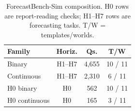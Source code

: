 \begin{table}[t]
\centering
\caption{ForecastBench-Sim composition. H0 rows are report-reading checks; H1--H7 rows are forecasting tasks. T/W = templates/worlds.}
\label{tab:benchmark-composition}
\small
\begin{tabular}{lccc}
\toprule
Family & Horiz. & Qs. & T/W \\
\midrule
Binary & H1--H7 & 4,655 & 10 / 11 \\
Continuous & H1--H7 & 2,310 & 6 / 11 \\
H0 binary & H0 & 562 & 10 / 11 \\
H0 continuous & H0 & 165 & 3 / 11 \\
\bottomrule
\end{tabular}
\end{table}
